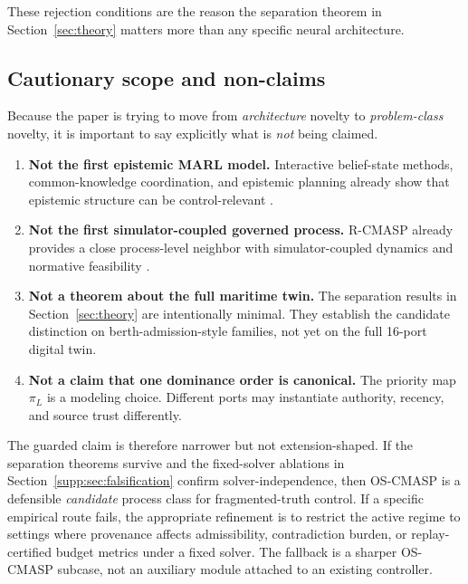 \documentclass[11pt]{article}
\newcommand{\1}{\mathbf{1}}
\theoremstyle{definition}
\theoremstyle{plain}
\theoremstyle{remark}
\begin{document}
These rejection conditions are the reason the separation theorem in Section~\ref{sec:theory} matters more than any specific neural architecture.

\subsection{Cautionary scope and non-claims}

Because the paper is trying to move from \emph{architecture} novelty to \emph{problem-class} novelty, it is important to say explicitly what is \emph{not} being claimed.

\begin{enumerate}[leftmargin=1.7em,label=\textbf{N\arabic*:}]
\item \textbf{Not the first epistemic MARL model.} Interactive belief-state methods, common-knowledge coordination, and epistemic planning already show that epistemic structure can be control-relevant \citep{GmytrasiewiczDoshi2005,SchroederdeWitt2019MACKRL,LiuLiu2018MEP}.
\item \textbf{Not the first simulator-coupled governed process.} R-CMASP already provides a close process-level neighbor with simulator-coupled dynamics and normative feasibility \citep{Dong2025RCMASP}.
\item \textbf{Not a theorem about the full maritime twin.} The separation results in Section~\ref{sec:theory} are intentionally minimal. They establish the candidate distinction on berth-admission-style families, not yet on the full 16-port digital twin.
\item \textbf{Not a claim that one dominance order is canonical.} The priority map $\pi_L$ is a modeling choice. Different ports may instantiate authority, recency, and source trust differently.
\end{enumerate}

The guarded claim is therefore narrower but not extension-shaped. If the separation theorems survive and the fixed-solver ablations in Section~\ref{supp:sec:falsification} confirm solver-independence, then OS-CMASP is a defensible \emph{candidate} process class for fragmented-truth control. If a specific empirical route fails, the appropriate refinement is to restrict the active regime to settings where provenance affects admissibility, contradiction burden, or replay-certified budget metrics under a fixed solver. The fallback is a sharper OS-CMASP subcase, not an auxiliary module attached to an existing controller.
\end{document}
